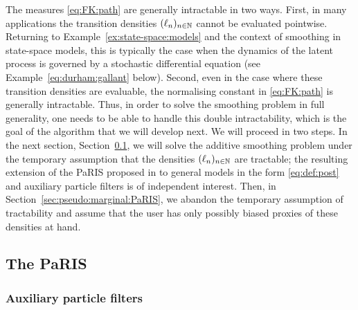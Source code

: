 The measures \eqref{eq:FK:path} are generally intractable in two ways. First, in many applications the transition densities $(\ell_{n})_{n \in \mathbb{N}}$ cannot be evaluated pointwise. Returning to Example~\ref{ex:state-space:models} and the context of smoothing in state-space models, this is typically the case when the dynamics of the latent process is governed by a stochastic differential equation (see Example~\ref{eq:durham:gallant} below). Second, even in the case where these transition densities are evaluable, the normalising constant in \eqref{eq:FK:path} is generally intractable. Thus, in order to solve the smoothing problem in full generality, one needs to be able to handle this double intractability, which is the goal of the algorithm that we will develop next. We will proceed in two steps. In the next section, Section~\ref{sec:PaRIS}, we will solve the additive smoothing problem under the temporary assumption that the densities $(\ell_{n})_{n \in \mathbb{N}}$ are tractable; the resulting extension of the PaRIS proposed in  \cite{olsson:westerborn:2014b} to general models in the form \eqref{eq:def:post} and auxiliary particle filters is of independent interest. Then, in Section~\ref{sec:pseudo:marginal:PaRIS}, we abandon the temporary assumption of tractability and assume that the user has only possibly biased proxies of these densities at hand. 

\subsection{The PaRIS}
\label{sec:PaRIS}


\subsubsection{Auxiliary particle filters}
\label{sec:SMC}

